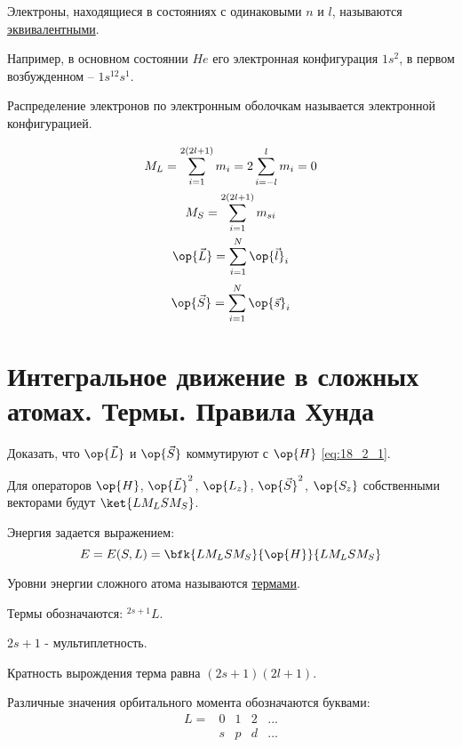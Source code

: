 \begin{defn}
Электроны, находящиеся в состояниях с одинаковыми $n$ и $l$, называются \underline{эквивалентными}.
\end{defn}

Например, в основном состоянии $He$ его электронная конфигурация  $1s^2$, в первом возбужденном -- $1s^12s^1$.

\begin{defn}
Распределение электронов по электронным оболочкам называется электронной конфигурацией. 
\end{defn}

\begin{gather*}
M_L = \sum_{i = 1}^{2(2l+1)} m_i = 2 \sum_{i=-l}^l m_i = 0 \\ 
M_S = \sum_{i = 1}^{2(2l+1)} m_{si} \\
\op{\vec{L}} = \sum_{i = 1}^{N} \op{\vec{l}}_i \\
\end{gather*}
\begin{equation}
\label{eq:18_2_3}
\op{\vec{S}} = \sum_{i = 1}^{N} \op{\vec{s}}_i
\end{equation}
\section{Интегральное движение в сложных атомах. Термы. Правила Хунда}

\begin{excr}
Доказать, что $\op{\vec{L}}$ и $\op{\vec{S}}$ коммутируют с $\op{H}$ \eqref{eq:18_2_1}.
\end{excr}

Для операторов $\op{H}$, $\op{\vec{L}}^2$, $\op{L_z}$, $\op{\vec{S}}^2$, $\op{S_z}$ собственными векторами будут $\ket{L M_L S M_S}$.

Энергия задается выражением: 
$$
E = E(S, L) = \bfk{L M_L S M_S}{\op{H}}{L M_L S M_S}
$$ 

Уровни энергии сложного атома называются \underline{термами}.

Термы обозначаются: $\boxed{^{2s+1}L}$.

$2s+1$ - мультиплетность.

Кратность вырождения терма равна $(2s+1)(2l+1)$.

Различные значения орбитального момента обозначаются буквами:
$$ 
\begin{matrix}
L= & 0 & 1 & 2& ...\\
      & s & p & d & ... 
\end{matrix}
$$

